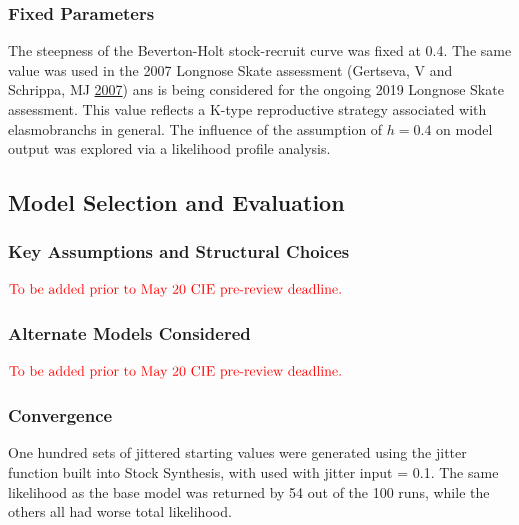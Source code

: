 \documentclass[12pt,]{article}
\begin{document}
\hypertarget{fixed-parameters}{%
\subsubsection{Fixed Parameters}\label{fixed-parameters}}

The steepness of the Beverton-Holt stock-recruit curve was fixed at 0.4.
The same value was used in the 2007 Longnose Skate assessment (Gertseva,
V and Schrippa, MJ \protect\hyperlink{ref-Gertseva2007}{2007}) ans is
being considered for the ongoing 2019 Longnose Skate assessment. This
value reflects a K-type reproductive strategy associated with
elasmobranchs in general. The influence of the assumption of \(h=0.4\)
on model output was explored via a likelihood profile analysis.

\hypertarget{model-selection-and-evaluation}{%
\subsection{Model Selection and
Evaluation}\label{model-selection-and-evaluation}}

\hypertarget{key-assumptions-and-structural-choices}{%
\subsubsection{Key Assumptions and Structural
Choices}\label{key-assumptions-and-structural-choices}}

\textbf{\(\color{red}{\text{To be added prior to May 20 CIE pre-review deadline.}}\)}

\hypertarget{alternate-models-considered}{%
\subsubsection{Alternate Models
Considered}\label{alternate-models-considered}}

\textbf{\(\color{red}{\text{To be added prior to May 20 CIE pre-review deadline.}}\)}

\hypertarget{convergence}{%
\subsubsection{Convergence}\label{convergence}}

One hundred sets of jittered starting values were generated using the
jitter function built into Stock Synthesis, with used with jitter input
= 0.1. The same likelihood as the base model was returned by 54 out of
the 100 runs, while the others all had worse total likelihood.
\end{document}
